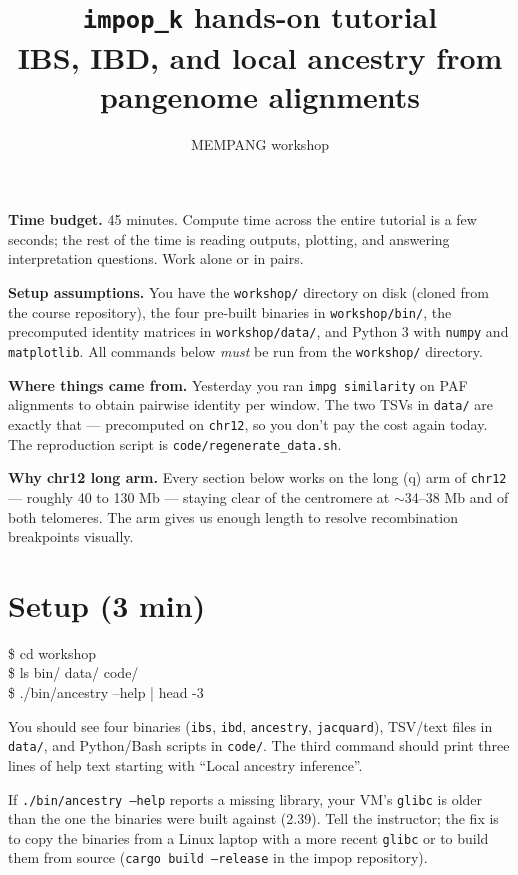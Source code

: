 \documentclass[11pt]{article}
\title{\textbf{\texttt{impop\_k} hands-on tutorial}\\[0.4em]
       \large IBS, IBD, and local ancestry from pangenome alignments}
\author{MEMPANG workshop}
\date{}
\begin{document}
\maketitle

\noindent
\textbf{Time budget.} 45 minutes. Compute time across the entire tutorial is
a few seconds; the rest of the time is reading outputs, plotting, and
answering interpretation questions. Work alone or in pairs.

\vspace{0.4em}
\noindent
\textbf{Setup assumptions.} You have the \texttt{workshop/} directory on disk
(cloned from the course repository), the four pre-built binaries in
\texttt{workshop/bin/}, the precomputed identity matrices in
\texttt{workshop/data/}, and Python 3 with \texttt{numpy} and
\texttt{matplotlib}. All commands below \emph{must} be run from the
\texttt{workshop/} directory.

\vspace{0.4em}
\noindent
\textbf{Where things came from.} Yesterday you ran \texttt{impg similarity}
on PAF alignments to obtain pairwise identity per window. The two TSVs in
\texttt{data/} are exactly that --- precomputed on \texttt{chr12}, so you
don't pay the cost again today. The reproduction script is
\texttt{code/regenerate\_data.sh}.

\vspace{0.4em}
\noindent
\textbf{Why chr12 long arm.} Every section below works on the long (q) arm
of \texttt{chr12} --- roughly 40 to 130 Mb --- staying clear of the
centromere at $\sim$34--38 Mb and of both telomeres. The arm gives us
enough length to resolve recombination breakpoints visually.

\section{Setup (3 min)}

\begin{cmd}
\$ cd workshop \\
\$ ls bin/ data/ code/ \\
\$ ./bin/ancestry --help | head -3
\end{cmd}

You should see four binaries (\texttt{ibs}, \texttt{ibd}, \texttt{ancestry},
\texttt{jacquard}), TSV/text files in \texttt{data/}, and Python/Bash scripts
in \texttt{code/}. The third command should print three lines of help text
starting with ``Local ancestry inference''.

\begin{warn}
If \texttt{./bin/ancestry --help} reports a missing library, your VM's
\texttt{glibc} is older than the one the binaries were built against
(2.39). Tell the instructor; the fix is to copy the binaries from a Linux
laptop with a more recent \texttt{glibc} or to build them from source
(\texttt{cargo build --release} in the impop repository).
\end{warn}
\end{document}
